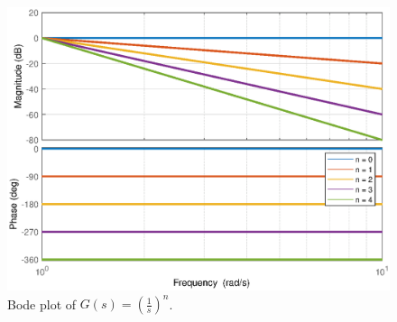 \begin{figure}[H] 
    \centering 
    \includegraphics[width=.7\textwidth]{images/bode4.eps}
    \caption{Bode plot of  $G(s) = (\frac{1}{s})^{n}$.}
\end{figure}

